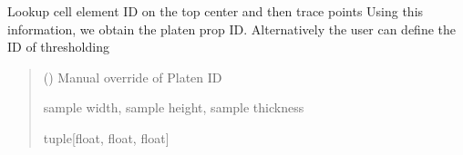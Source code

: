\documentclass[letterpaper,10pt,english]{sphinxmanual}
\begin{document}
\begin{fulllineitems}
\begin{fulllineitems}
\begin{quote}
\begin{description}
\end{description}\end{quote}

\end{fulllineitems}


\begin{fulllineitems}
\label{\detokenize{pyfdempp:pyfdempp.pyfdempp.Model.rock_sample_dimensions}}
\pysigstartsignatures
{}
\pysigstopsignatures
\sphinxAtStartPar
Lookup cell element ID on the top center and then trace points Using this information, we obtain the platen prop ID.
Alternatively the user can define the ID of thresholding
\begin{quote}\begin{description}
\sphinxAtStartPar
{} () \textendash{} Manual override of Platen ID

\sphinxAtStartPar
sample width, sample height, sample thickness

\sphinxAtStartPar
tuple{[}float, float, float{]}


\end{description}
\end{quote}
\end{fulllineitems}
\end{fulllineitems}
\end{document}
